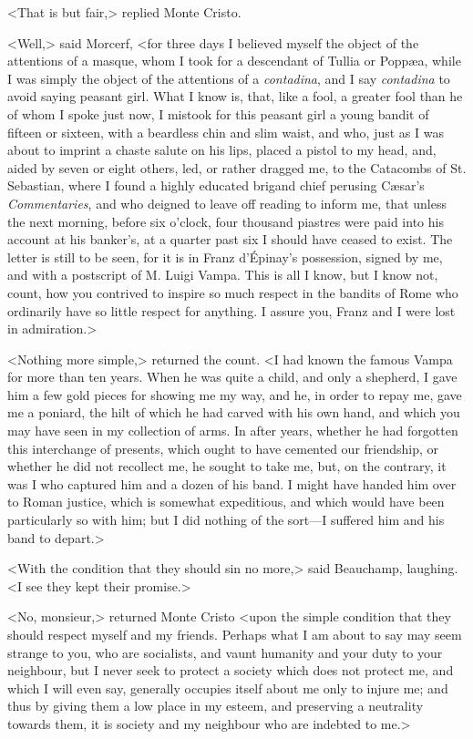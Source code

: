  <That is but fair,> replied Monte Cristo. 

 <Well,> said Morcerf, <for three days I believed myself the object of the attentions of a masque, whom I took for a descendant of Tullia or Poppæa, while I was simply the object of the attentions of a \textit{contadina}, and I say \textit{contadina} to avoid saying peasant girl. What I know is, that, like a fool, a greater fool than he of whom I spoke just now, I mistook for this peasant girl a young bandit of fifteen or sixteen, with a beardless chin and slim waist, and who, just as I was about to imprint a chaste salute on his lips, placed a pistol to my head, and, aided by seven or eight others, led, or rather dragged me, to the Catacombs of St. Sebastian, where I found a highly educated brigand chief perusing Cæsar's \textit{Commentaries}, and who deigned to leave off reading to inform me, that unless the next morning, before six o'clock, four thousand piastres were paid into his account at his banker's, at a quarter past six I should have ceased to exist. The letter is still to be seen, for it is in Franz d'Épinay's possession, signed by me, and with a postscript of M. Luigi Vampa. This is all I know, but I know not, count, how you contrived to inspire so much respect in the bandits of Rome who ordinarily have so little respect for anything. I assure you, Franz and I were lost in admiration.> 

 <Nothing more simple,> returned the count. <I had known the famous Vampa for more than ten years. When he was quite a child, and only a shepherd, I gave him a few gold pieces for showing me my way, and he, in order to repay me, gave me a poniard, the hilt of which he had carved with his own hand, and which you may have seen in my collection of arms. In after years, whether he had forgotten this interchange of presents, which ought to have cemented our friendship, or whether he did not recollect me, he sought to take me, but, on the contrary, it was I who captured him and a dozen of his band. I might have handed him over to Roman justice, which is somewhat expeditious, and which would have been particularly so with him; but I did nothing of the sort—I suffered him and his band to depart.> 

 <With the condition that they should sin no more,> said Beauchamp, laughing. <I see they kept their promise.> 

 <No, monsieur,> returned Monte Cristo <upon the simple condition that they should respect myself and my friends. Perhaps what I am about to say may seem strange to you, who are socialists, and vaunt humanity and your duty to your neighbour, but I never seek to protect a society which does not protect me, and which I will even say, generally occupies itself about me only to injure me; and thus by giving them a low place in my esteem, and preserving a neutrality towards them, it is society and my neighbour who are indebted to me.> 

